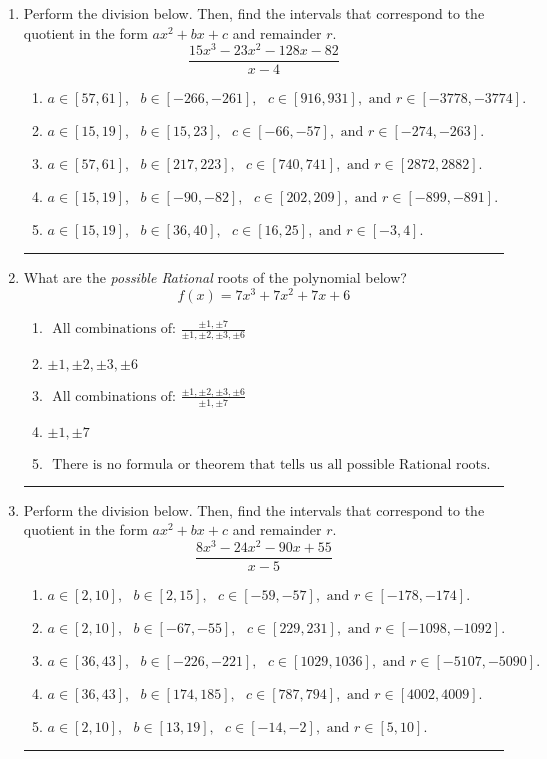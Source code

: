 \documentclass[14pt]{extbook}
\newcommand{\litem}[1]{\item#1\hspace*{-1cm}\rule{\textwidth}{0.4pt}}
\begin{document}
\begin{enumerate}
{\begin{enumerate}[label=\Alph*.]
\end{enumerate} }
\litem{
Perform the division below. Then, find the intervals that correspond to the quotient in the form $ax^2+bx+c$ and remainder $r$.\[ \frac{15x^{3} -23 x^{2} -128 x -82}{x -4} \]\begin{enumerate}[label=\Alph*.]
\item \( a \in [57, 61], \text{   } b \in [-266, -261], \text{   } c \in [916, 931], \text{   and   } r \in [-3778, -3774]. \)
\item \( a \in [15, 19], \text{   } b \in [15, 23], \text{   } c \in [-66, -57], \text{   and   } r \in [-274, -263]. \)
\item \( a \in [57, 61], \text{   } b \in [217, 223], \text{   } c \in [740, 741], \text{   and   } r \in [2872, 2882]. \)
\item \( a \in [15, 19], \text{   } b \in [-90, -82], \text{   } c \in [202, 209], \text{   and   } r \in [-899, -891]. \)
\item \( a \in [15, 19], \text{   } b \in [36, 40], \text{   } c \in [16, 25], \text{   and   } r \in [-3, 4]. \)

\end{enumerate} }
\litem{
What are the \textit{possible Rational} roots of the polynomial below?\[ f(x) = 7x^{3} +7 x^{2} +7 x + 6 \]\begin{enumerate}[label=\Alph*.]
\item \( \text{ All combinations of: }\frac{\pm 1,\pm 7}{\pm 1,\pm 2,\pm 3,\pm 6} \)
\item \( \pm 1,\pm 2,\pm 3,\pm 6 \)
\item \( \text{ All combinations of: }\frac{\pm 1,\pm 2,\pm 3,\pm 6}{\pm 1,\pm 7} \)
\item \( \pm 1,\pm 7 \)
\item \( \text{ There is no formula or theorem that tells us all possible Rational roots.} \)

\end{enumerate} }
\litem{
Perform the division below. Then, find the intervals that correspond to the quotient in the form $ax^2+bx+c$ and remainder $r$.\[ \frac{8x^{3} -24 x^{2} -90 x + 55}{x -5} \]\begin{enumerate}[label=\Alph*.]
\item \( a \in [2, 10], \text{   } b \in [2, 15], \text{   } c \in [-59, -57], \text{   and   } r \in [-178, -174]. \)
\item \( a \in [2, 10], \text{   } b \in [-67, -55], \text{   } c \in [229, 231], \text{   and   } r \in [-1098, -1092]. \)
\item \( a \in [36, 43], \text{   } b \in [-226, -221], \text{   } c \in [1029, 1036], \text{   and   } r \in [-5107, -5090]. \)
\item \( a \in [36, 43], \text{   } b \in [174, 185], \text{   } c \in [787, 794], \text{   and   } r \in [4002, 4009]. \)
\item \( a \in [2, 10], \text{   } b \in [13, 19], \text{   } c \in [-14, -2], \text{   and   } r \in [5, 10]. \)


\end{enumerate}}
\end{enumerate}
\end{document}
